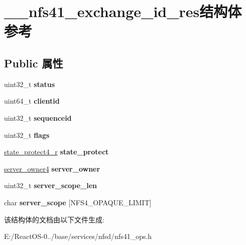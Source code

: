 \hypertarget{struct____nfs41__exchange__id__res}{}\section{\+\_\+\+\_\+nfs41\+\_\+exchange\+\_\+id\+\_\+res结构体 参考}
\label{struct____nfs41__exchange__id__res}
\subsection*{Public 属性}
\begin{DoxyCompactItemize}
\item 
\mbox{\label{struct____nfs41__exchange__id__res_abc8b25c6f8cdd30445591ea08d8c476c}} 
uint32\+\_\+t {\bfseries status}
\item 
\mbox{\label{struct____nfs41__exchange__id__res_a28e0f17a3ef0855e4d6828756de47b52}} 
uint64\+\_\+t {\bfseries clientid}
\item 
\mbox{\label{struct____nfs41__exchange__id__res_a181458fc4bf8430dcbe81e7ff25d54e4}} 
uint32\+\_\+t {\bfseries sequenceid}
\item 
\mbox{\label{struct____nfs41__exchange__id__res_aa6c4e57d836aa936a6c58efbaefec02f}} 
uint32\+\_\+t {\bfseries flags}
\item 
\mbox{\label{struct____nfs41__exchange__id__res_acfc5a47cab5decb6acf912ebeca4e98a}} 
\hyperlink{struct____state__protect4__r}{state\+\_\+protect4\+\_\+r} {\bfseries state\+\_\+protect}
\item 
\mbox{\label{struct____nfs41__exchange__id__res_a837b60f3c28ec9c8b25cacc10e9f83b0}} 
\hyperlink{struct____server__owner4}{server\+\_\+owner4} {\bfseries server\+\_\+owner}
\item 
\mbox{\label{struct____nfs41__exchange__id__res_a9643216e6514fa18f9369ba2ebf39645}} 
uint32\+\_\+t {\bfseries server\+\_\+scope\+\_\+len}
\item 
\mbox{\label{struct____nfs41__exchange__id__res_af96ef53b552be4d60ba17531ce3ad327}} 
char {\bfseries server\+\_\+scope} \mbox{[}N\+F\+S4\+\_\+\+O\+P\+A\+Q\+U\+E\+\_\+\+L\+I\+M\+IT\mbox{]}
\end{DoxyCompactItemize}


该结构体的文档由以下文件生成\+:\begin{DoxyCompactItemize}
\item 
E\+:/\+React\+O\+S-\/0../base/services/nfsd/nfs41\+\_\+ops.\+h\end{DoxyCompactItemize}
